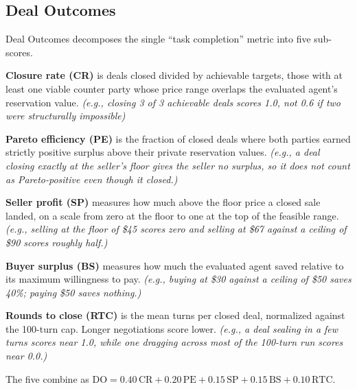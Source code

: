 \documentclass{article} %
\newcommand{\eg}[1]{\textit{\small(e.g., #1)}}
\begin{document}
\subsection{Deal Outcomes}
Deal Outcomes decomposes the single ``task completion'' metric into five sub-scores.

\textbf{Closure rate (CR)} is deals closed divided by achievable targets, those with at least one viable counter party whose price range overlaps the evaluated agent's reservation value. \eg{closing 3 of 3 achievable deals scores 1.0, not 0.6 if two were structurally impossible}

\textbf{Pareto efficiency (PE)} is the fraction of closed deals where both parties earned strictly positive surplus above their private reservation values. \eg{a deal closing exactly at the seller's floor gives the seller no surplus, so it does not count as Pareto-positive even though it closed.}

\textbf{Seller profit (SP)} measures how much above the floor price a closed sale landed, on a scale from zero at the floor to one at the top of the feasible range. \eg{selling at the floor of \$45 scores zero and selling at \$67 against a ceiling of \$90 scores roughly half.}

\textbf{Buyer surplus (BS)} measures how much the evaluated agent saved relative to its maximum willingness to pay. \eg{buying at \$30 against a ceiling of \$50 saves 40\%; paying \$50 saves nothing.}

\textbf{Rounds to close (RTC)} is the mean turns per closed deal, normalized against the 100-turn cap. Longer negotiations score lower. \eg{a deal sealing in a few turns scores near 1.0, while one dragging across most of the 100-turn run scores near 0.0.}

The five combine as $\mathrm{DO} = 0.40\,\mathrm{CR} + 0.20\,\mathrm{PE} + 0.15\,\mathrm{SP} + 0.15\,\mathrm{BS} + 0.10\,\mathrm{RTC}$.
\end{document}

